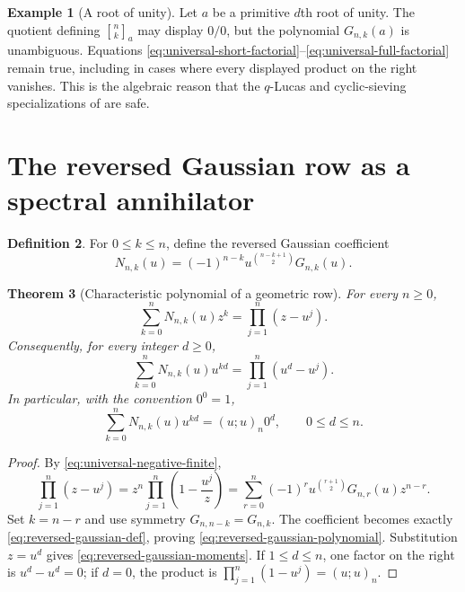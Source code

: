 \documentclass[11pt,oneside,openany]{book}
\newtheorem{theorem}{Theorem}[chapter]
\theoremstyle{definition}
\newtheorem{definition}[theorem]{Definition}
\newtheorem{example}[theorem]{Example}
\theoremstyle{remark}
\newcommand{\Qbinom}[3]{\genfrac{[}{]}{0pt}{}{#1}{#2}_{#3}}
\begin{document}
\begin{example}[A root of unity]
Let $a$ be a primitive $d$th root of unity.  The quotient defining $\Qbinom nk a$ may display $0/0$, but the polynomial $G_{n,k}(a)$ is unambiguous.  Equations \eqref{eq:universal-short-factorial}--\eqref{eq:universal-full-factorial} remain true, including in cases where every displayed product on the right vanishes.  This is the algebraic reason that the $q$-Lucas and cyclic-sieving specializations of  are safe.
\end{example}

\section{The reversed Gaussian row as a spectral annihilator}

\begin{definition}
For $0\le k\le n$, define the reversed Gaussian coefficient
\begin{equation}
 N_{n,k}(u)=(-1)^{n-k}u^{\binom{n-k+1}{2}}G_{n,k}(u).\label{eq:reversed-gaussian-def}
\end{equation}
\end{definition}

\begin{theorem}[Characteristic polynomial of a geometric row]\label{thm:reversed-gaussian-polynomial}
For every $n\ge0$,
\begin{equation}
 \sum_{k=0}^nN_{n,k}(u)z^k
 =\prod_{j=1}^n(z-u^j).\label{eq:reversed-gaussian-polynomial}
\end{equation}
Consequently, for every integer $d\ge0$,
\begin{equation}
 \sum_{k=0}^nN_{n,k}(u)u^{kd}
 =\prod_{j=1}^n(u^d-u^j).\label{eq:reversed-gaussian-moments}
\end{equation}
In particular, with the convention $0^0=1$,
\begin{equation}
 \sum_{k=0}^nN_{n,k}(u)u^{kd}=(u;u)_n0^d,
 \qquad 0\le d\le n.\label{eq:reversed-low-moments}
\end{equation}
\end{theorem}

\begin{proof}
By \eqref{eq:universal-negative-finite},
\[
 \prod_{j=1}^n(z-u^j)
 =z^n\prod_{j=1}^n\left(1-\frac{u^j}{z}\right)
 =\sum_{r=0}^n(-1)^ru^{\binom{r+1}{2}}G_{n,r}(u)z^{n-r}.
\]
Set $k=n-r$ and use symmetry $G_{n,n-k}=G_{n,k}$.  The coefficient becomes exactly \eqref{eq:reversed-gaussian-def}, proving \eqref{eq:reversed-gaussian-polynomial}.  Substitution $z=u^d$ gives \eqref{eq:reversed-gaussian-moments}.  If $1\le d\le n$, one factor on the right is $u^d-u^d=0$; if $d=0$, the product is $\prod_{j=1}^n(1-u^j)=(u;u)_n$.
\end{proof}
\end{document}
